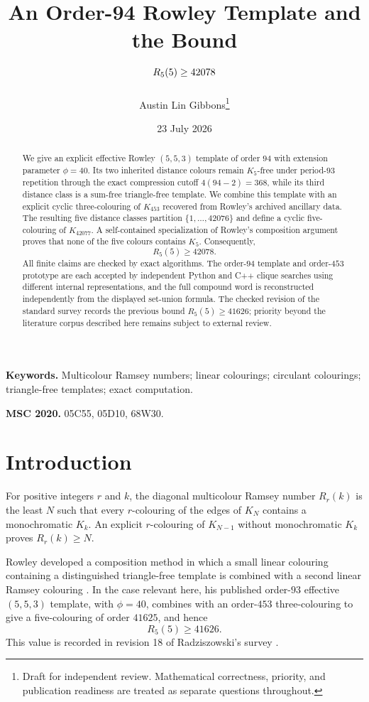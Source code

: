 \documentclass[11pt]{article}
\title{\bfseries An Order-94 Rowley Template and the Bound\\[3pt]
  \texorpdfstring{\boldmath$R_5(5)\ge 42078$}{R5(5) >= 42078}}
\author{Austin Lin Gibbons\thanks{Draft for independent review. Mathematical
correctness, priority, and publication readiness are treated as separate
questions throughout.}}
\date{23 July 2026}
\theoremstyle{definition}
\theoremstyle{remark}
\begin{document}
\maketitle

\begin{abstract}
We give an explicit effective Rowley $(5,5,3)$ template of order $94$ with
extension parameter $\phi=40$.  Its two inherited distance colours remain
$K_5$-free under period-$93$ repetition through the exact compression cutoff
$4(94-2)=368$, while its third distance class is a sum-free triangle-free
template.  We combine this template with an explicit cyclic three-colouring
of $K_{453}$ recovered from Rowley's archived ancillary data.  The resulting
five distance classes partition $\{1,\ldots,42076\}$ and define a cyclic
five-colouring of $K_{42077}$.  A self-contained specialization of Rowley's
composition argument proves that none of the five colours contains $K_5$.
Consequently,
\[
  R_5(5)\ge 42078.
\]
All finite claims are checked by exact algorithms.  The order-$94$ template
and order-$453$ prototype are each accepted by independent Python and C++
clique searches using different internal representations, and the full
compound word is reconstructed independently from the displayed set-union
formula.  The checked revision of the standard survey records the previous
bound $R_5(5)\ge41626$; priority beyond the literature corpus described here
remains subject to external review.
\end{abstract}

\medskip
\noindent\textbf{Keywords.} Multicolour Ramsey numbers; linear colourings;
circulant colourings; triangle-free templates; exact computation.

\noindent\textbf{MSC 2020.} 05C55, 05D10, 68W30.

\section{Introduction}

For positive integers $r$ and $k$, the diagonal multicolour Ramsey number
$R_r(k)$ is the least $N$ such that every $r$-colouring of the edges of
$K_N$ contains a monochromatic $K_k$.  An explicit $r$-colouring of
$K_{N-1}$ without monochromatic $K_k$ proves $R_r(k)\ge N$.

Rowley developed a composition method in which a small linear colouring
containing a distinguished triangle-free template is combined with a second
linear Ramsey colouring \cite{rowley-general,rowley-sat}.  In the case
relevant here, his published order-$93$ effective $(5,5,3)$ template, with
$\phi=40$, combines with an order-$453$ three-colouring to give a
five-colouring of order $41625$, and hence
\[
  R_5(5)\ge41626.
\]
This value is recorded in revision 18 of Radziszowski's survey
\cite{radziszowski}.
\end{document}
